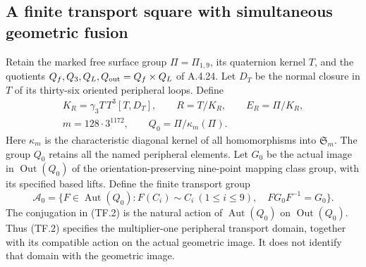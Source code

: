 \subsection{A finite transport square with simultaneous geometric fusion}

Retain the marked free surface group \(\Pi=\Pi_{1,9}\),
its quaternion kernel \(T\), and the quotients
\(Q_f,Q_3,Q_L,Q_{\rm out}=Q_f\times Q_L\) of A.4.24.
Let \(D_T\) be the normal closure in \(T\) of its thirty-six
oriented peripheral loops. Define
\[
 \begin{gathered}
 K_R=\gamma_3T\,T^3[T,D_T],\qquad R=T/K_R,
       \qquad E_R=\Pi/K_R,\\
 m=128\cdot3^{1172},\qquad
 Q_0=\Pi/\kappa_m(\Pi).
 \end{gathered}
 \tag{TF.1}
\]
Here \(\kappa_m\) is the characteristic diagonal kernel of
all homomorphisms into \(\mathfrak S_m\). The group \(Q_0\)
retains all the named peripheral elements. Let \(G_0\) be the
actual image in \(\operatorname{Out}(Q_0)\) of the
orientation-preserving nine-point mapping class group,
with its specified based lifts. Define the finite transport group
\[
 \mathcal A_0=
 \{F\in\operatorname{Aut}(Q_0):
       F(C_i)\sim C_i\ (1\le i\le9),\quad
       F G_0F^{-1}=G_0\}.
 \tag{TF.2}
\]
The conjugation in (TF.2) is the natural action of
\(\operatorname{Aut}(Q_0)\) on \(\operatorname{Out}(Q_0)\).
Thus (TF.2) specifies the multiplier-one peripheral transport
domain, together with its compatible action on the actual
geometric image. It does not identify that domain with the
geometric image.

